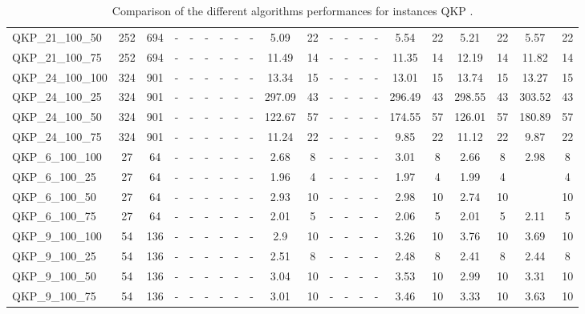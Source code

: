 \begin{sidewaystable}[!ht]
{\begin{tabular}{lcccccccccccccccccccc}
QKP\_21\_100\_50 & 252 & 694 &  - &  - &  - &  - &  - &  - &  \textcolor{blue2}{5.09} & 22 &  - &  - &  - &  - & 5.54 & 22 & 5.21 & 22 & 5.57 & 22 \\
QKP\_21\_100\_75 & 252 & 694 &  - &  - &  - &  - &  - &  - & 11.49 & 14 &  - &  - &  - &  - &  \textcolor{blue2}{11.35} & 14 & 12.19 & 14 & 11.82 & 14 \\
QKP\_24\_100\_100 & 324 & 901 &  - &  - &  - &  - &  - &  - & 13.34 & 15 &  - &  - &  - &  - &  \textcolor{blue2}{13.01} & 15 & 13.74 & 15 & 13.27 & 15 \\
QKP\_24\_100\_25 & 324 & 901 &  - &  - &  - &  - &  - &  - & 297.09 & 43 &  - &  - &  - &  - &  \textcolor{blue2}{296.49} & 43 & 298.55 & 43 & 303.52 & 43 \\
QKP\_24\_100\_50 & 324 & 901 &  - &  - &  - &  - &  - &  - &  \textcolor{blue2}{122.67} & 57 &  - &  - &  - &  - & 174.55 & 57 & 126.01 & 57 & 180.89 & 57 \\
QKP\_24\_100\_75 & 324 & 901 &  - &  - &  - &  - &  - &  - & 11.24 & 22 &  - &  - &  - &  - &  \textcolor{blue2}{9.85} & 22 & 11.12 & 22 & 9.87 & 22 \\
QKP\_6\_100\_100 & 27 & 64 &  - &  - &  - &  - &  - &  - & 2.68 & 8 &  - &  - &  - &  - & 3.01 & 8 &  \textcolor{blue2}{2.66} & 8 & 2.98 & 8 \\
QKP\_6\_100\_25 & 27 & 64 &  - &  - &  - &  - &  - &  - &  \textcolor{blue2}{1.96} & 4 &  - &  - &  - &  - & 1.97 & 4 & 1.99 & 4 &  \textcolor{blue2}{1.96 & 4 \\
QKP\_6\_100\_50 & 27 & 64 &  - &  - &  - &  - &  - &  - & 2.93 & 10 &  - &  - &  - &  - & 2.98 & 10 &  \textcolor{blue2}{2.74} & 10 &  \textcolor{blue2}{2.74 & 10 \\
QKP\_6\_100\_75 & 27 & 64 &  - &  - &  - &  - &  - &  - &  \textcolor{blue2}{2.01} & 5 &  - &  - &  - &  - & 2.06 & 5 &  \textcolor{blue2}{2.01} & 5 & 2.11 & 5 \\
QKP\_9\_100\_100 & 54 & 136 &  - &  - &  - &  - &  - &  - &  \textcolor{blue2}{2.9} & 10 &  - &  - &  - &  - & 3.26 & 10 & 3.76 & 10 & 3.69 & 10 \\
QKP\_9\_100\_25 & 54 & 136 &  - &  - &  - &  - &  - &  - & 2.51 & 8 &  - &  - &  - &  - & 2.48 & 8 &  \textcolor{blue2}{2.41} & 8 & 2.44 & 8 \\
QKP\_9\_100\_50 & 54 & 136 &  - &  - &  - &  - &  - &  - & 3.04 & 10 &  - &  - &  - &  - & 3.53 & 10 &  \textcolor{blue2}{2.99} & 10 & 3.31 & 10 \\
QKP\_9\_100\_75 & 54 & 136 &  - &  - &  - &  - &  - &  - &  \textcolor{blue2}{3.01} & 10 &  - &  - &  - &  - & 3.46 & 10 & 3.33 & 10 & 3.63 & 10 \\
\bottomrule
\end{tabular}
}%
\caption{Comparison of the different algorithms performances for instances QKP .}
\label{tab:table_compare_QKP }
\end{sidewaystable}
